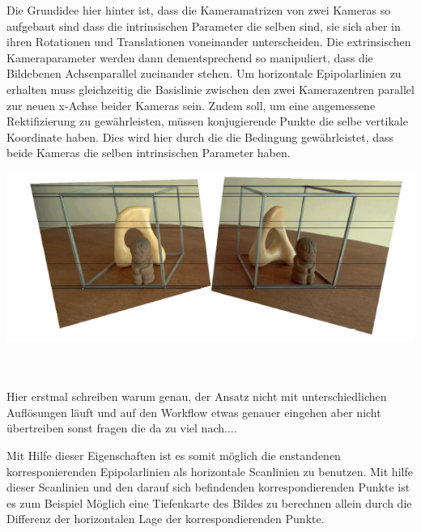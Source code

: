  Die Grundidee hier hinter ist, dass die Kameramatrizen von zwei Kameras so aufgebaut sind dass die intrinsischen Parameter die selben sind, sie sich aber in ihren Rotationen und Translationen voneinander unterscheiden. Die extrinsischen Kameraparameter werden dann dementsprechend so manipuliert, dass die Bildebenen Achsenparallel zueinander stehen\cite{FusielloSite,Fusiello}. Um horizontale Epipolarlinien zu erhalten muss gleichzeitig die Basislinie zwischen den zwei Kamerazentren parallel zur neuen x-Achse beider Kameras sein. Zudem soll, um eine angemessene Rektifizierung zu gewährleisten, müssen konjugierende Punkte die selbe vertikale Koordinate haben. Dies wird hier durch die die Bedingung gewährleistet, dass beide Kameras die selben intrinsischen Parameter haben\cite{FusielloSite}.

\begin{minipage}{\linewidth}
	\centering
	\includegraphics[width=.8\linewidth]{images/rectifiziertesBildAusZZ.png}
\end{minipage}\\ \\


Hier erstmal schreiben warum genau, der Ansatz nicht mit unterschiedlichen Auflösungen läuft und auf den Workflow etwas genauer eingehen aber nicht übertreiben sonst fragen die da zu viel nach....


Mit Hilfe dieser Eigenschaften ist es somit möglich die enstandenen korresponierenden Epipolarlinien als horizontale Scanlinien zu benutzen\cite{Javier,ZZ}. Mit hilfe dieser Scanlinien und den darauf sich befindenden korrespondierenden Punkte ist es zum Beispiel Möglich eine Tiefenkarte des Bildes zu berechnen allein durch die Differenz der horizontalen Lage der korrespondierenden Punkte\cite{Javier,ZZ}. \\

